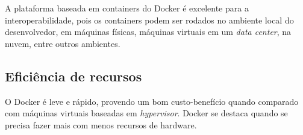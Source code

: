 A plataforma baseada em containers do Docker é excelente para a interoperabilidade, pois os containers podem ser rodados no ambiente local do desenvolvedor, em máquinas físicas, máquinas virtuais em um \textit{data center}, na nuvem, entre outros ambientes.

\subsection{Eficiência de recursos}

O Docker é leve e rápido, provendo um bom custo-benefício quando comparado com máquinas virtuais baseadas em \textit{hypervisor}. Docker se destaca quando se precisa fazer mais com menos recursos de hardware.

